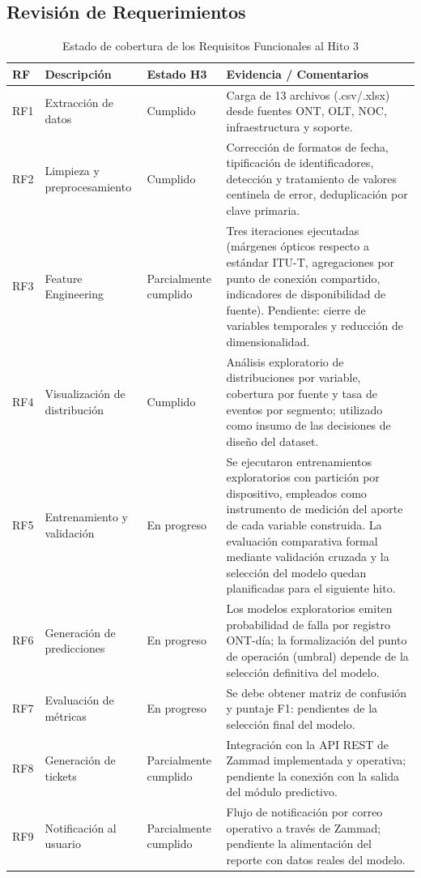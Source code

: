 \documentclass[12pt,a4paper]{article}
\begin{document}
\subsection{Revisión de Requerimientos}

\begin{table}[H]
\centering
\small 
\renewcommand{\arraystretch}{1.3}
\begin{tabular}{|p{1.1cm}|p{2.9cm}|p{1.9cm}|p{7.2cm}|}
\hline
\textbf{RF} & \textbf{Descripción} & \textbf{Estado H3} & \textbf{Evidencia / Comentarios} \\
\hline
RF1 & Extracción de datos & Cumplido & Carga de 13 archivos (.csv/.xlsx) desde fuentes ONT, OLT, NOC, infraestructura y soporte. \\
\hline
RF2 & Limpieza y preprocesamiento & Cumplido & Corrección de formatos de fecha, tipificación de identificadores, detección y tratamiento de valores centinela de error, deduplicación por clave primaria. \\
\hline
RF3 & Feature Engineering & Parcialmente cumplido & Tres iteraciones ejecutadas (márgenes ópticos respecto a estándar ITU-T, agregaciones por punto de conexión compartido, indicadores de disponibilidad de fuente). Pendiente: cierre de variables temporales y reducción de dimensionalidad. \\
\hline
RF4 & Visualización de distribución & Cumplido & Análisis exploratorio de distribuciones por variable, cobertura por fuente y tasa de eventos por segmento; utilizado como insumo de las decisiones de diseño del dataset. \\
\hline
RF5 & Entrenamiento y validación & En progreso & Se ejecutaron entrenamientos exploratorios con partición por dispositivo, empleados como instrumento de medición del aporte de cada variable construida. La evaluación comparativa formal mediante validación cruzada y la selección del modelo quedan planificadas para el siguiente hito. \\
\hline
RF6 & Generación de predicciones & En progreso & Los modelos exploratorios emiten probabilidad de falla por registro ONT-día; la formalización del punto de operación (umbral) depende de la selección definitiva del modelo. \\
\hline
RF7 & Evaluación de métricas & En progreso & Se debe obtener matriz de confusión y puntaje F1: pendientes de la selección final del modelo. \\
\hline
RF8 & Generación de tickets & Parcialmente cumplido & Integración con la API REST de Zammad implementada y operativa; pendiente la conexión con la salida del módulo predictivo. \\
\hline
RF9 & Notificación al usuario & Parcialmente cumplido & Flujo de notificación por correo operativo a través de Zammad; pendiente la alimentación del reporte con datos reales del modelo. \\
\hline
\end{tabular}
\caption{Estado de cobertura de los Requisitos Funcionales al Hito 3}
\label{tab:cobertura-rf}
\end{table}
 
\end{document}

